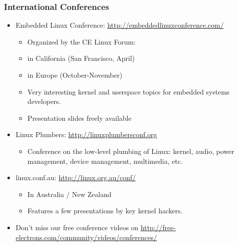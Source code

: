 \begin{frame}
  \frametitle{International Conferences}
  \begin{itemize}
  \item Embedded Linux Conference: \url{http://embeddedlinuxconference.com/}
    \begin{itemize}
    \item Organized by the CE Linux Forum:
    \item in California (San Francisco, April)
    \item in Europe (October-November)
    \item Very interesting kernel and userspace topics for embedded
      systems developers.
    \item Presentation slides freely available
    \end{itemize}
  \item Linux Plumbers: \url{http://linuxplumbersconf.org}
    \begin{itemize}
    \item Conference on the low-level plumbing of Linux: kernel,
      audio, power management, device management, multimedia, etc.
    \end{itemize}
  \item linux.conf.au: \url{http://linux.org.au/conf/}
    \begin{itemize}
    \item In Australia / New Zealand
    \item Features a few presentations by key kernel hackers.
    \end{itemize}
  \item Don't miss our free conference videos on
    \url{http://free-electrons.com/community/videos/conferences/}
  \end{itemize}
\end{frame}

